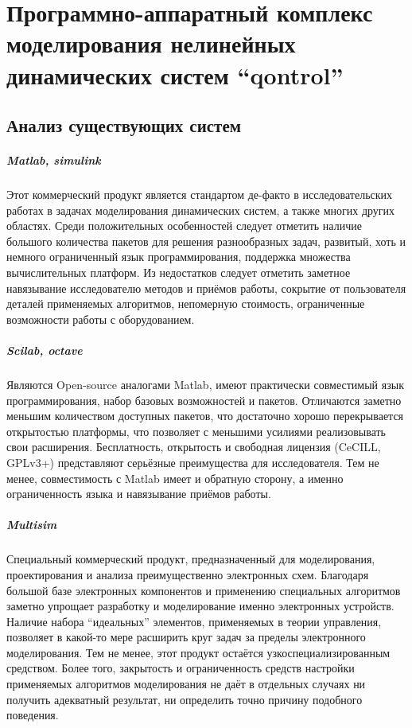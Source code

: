 \chapter{Программно-аппаратный комплекс моделирования нелинейных динамических систем ``qontrol''}
\label{chapter_qontrol}

\section{Анализ существующих систем} %

\paragraph{Matlab, simulink}

Этот коммерческий продукт является стандартом де-факто
в исследовательских работах в задачах моделирования динамических систем,
а также многих других областях. Среди положительных особенностей следует
отметить наличие большого количества пакетов для решения разнообразных задач,
развитый, хоть и немного ограниченный язык программирования, поддержка множества
вычислительных платформ. Из недостатков следует отметить заметное навязывание
исследователю методов и приёмов работы, сокрытие от пользователя деталей применяемых
алгоритмов, непомерную стоимость, ограниченные возможности работы с оборудованием.


\paragraph{Scilab, octave}

Являются Open-source аналогами Matlab, имеют практически совместимый язык программирования,
набор базовых возможностей и пакетов. Отличаются заметно меньшим количеством доступных
пакетов, что достаточно хорошо перекрывается открытостью платформы, что позволяет
с меньшими усилиями реализовывать свои расширения. Бесплатность, открытость
и свободная лицензия (CeCILL, GPLv3+) представляют серьёзные преимущества для
исследователя. Тем не менее, совместимость с Matlab имеет и обратную сторону,
а именно ограниченность языка и навязывание приёмов работы.

\paragraph{Multisim}

Специальный коммерческий продукт, предназначенный для моделирования, проектирования
и анализа преимущественно электронных схем. Благодаря большой базе электронных
компонентов и применению специальных алгоритмов заметно упрощает
разработку и моделирование именно электронных устройств. Наличие
набора ``идеальных'' элементов, применяемых в теории управления,
позволяет в какой-то мере расширить круг задач за пределы
электронного моделирования. Тем не менее, этот продукт остаётся
узкоспециализированным средством. Более того, закрытость и ограниченность средств настройки
применяемых алгоритмов моделирования не даёт в отдельных случаях
ни получить адекватный результат, ни определить точно причину подобного поведения.

